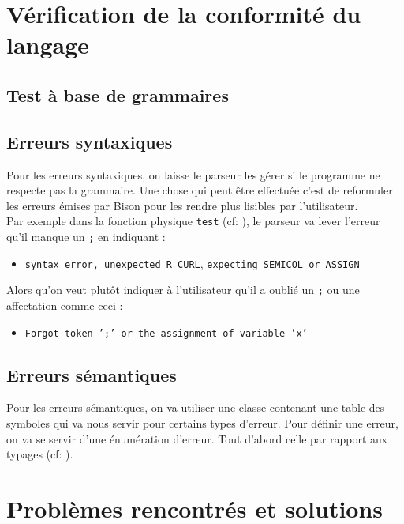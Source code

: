 \documentclass[a4paper, 11pt]{article}
\newcommand{\prog}[1]{\texttt{#1}}
\begin{document}
\section{Vérification de la conformité du langage}

\subsection{Test à base de grammaires}


\subsection{Erreurs syntaxiques}

Pour les erreurs syntaxiques, on laisse le parseur les gérer si le programme ne respecte pas la grammaire. Une chose qui peut être effectuée c'est de reformuler les erreurs émises par Bison pour les rendre plus lisibles par l'utilisateur. \\

Par exemple dans la fonction physique \prog{test} (cf: ), le parseur va lever l'erreur qu'il manque un \prog{;} en indiquant :
\begin{itemize}
    \centering
    \item \prog{syntax error, unexpected R_CURL}, \prog{expecting SEMICOL or ASSIGN}
\end{itemize}

Alors qu'on veut plutôt indiquer à l'utilisateur qu'il a oublié un \prog{;} ou une affectation comme ceci :
\begin{itemize}
    \centering
    \item[] \prog{Forgot token ';' or the assignment of variable 'x'}
\end{itemize}

\subsection{Erreurs sémantiques}

Pour les erreurs sémantiques, on va utiliser une classe contenant une table des symboles qui va nous servir pour certains types d'erreur. Pour définir une erreur, on va se servir d'une énumération d'erreur. Tout d'abord celle par rapport aux typages (cf: ).

\section{Problèmes rencontrés et solutions}
\label{sec:problems-xmi}
\end{document}
